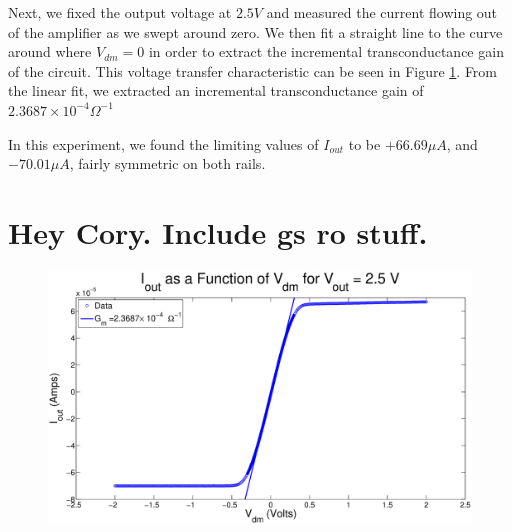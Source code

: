 Next, we fixed the output voltage at $2.5V$ and measured the current flowing
out of the amplifier as we swept \Vdm around zero. We then fit a straight line
to the curve around where $V_{dm} = 0$ in order to extract the incremental
transconductance gain of the circuit.  This voltage transfer characteristic 
can be seen in Figure \ref{fig:exp2p3}.
From the linear fit, we extracted an incremental transconductance gain of $2.3687 \times 10^{-4} \Omega^{-1}$

In this experiment, we found the limiting values of $I_{out}$ to be $+ 66.69 \mu A$, and $-70.01 \mu A$, fairly symmetric on both rails. 



\section{Hey Cory. Include gs ro stuff.}


\begin{figure}[H]
\centering
\includegraphics[width=\linewidth]{../Figures/Exp2P3.eps}
\caption{}
\label{fig:exp2p3}
\end{figure}